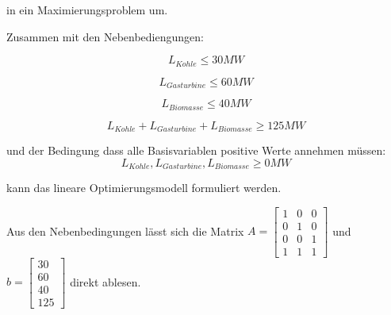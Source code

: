 \documentclass{eegreport}
\begin{document}
in ein Maximierungsproblem um.


Zusammen mit den Nebenbediengungen:

\begin{equation}
L_{Kohle} \leq 30MW
\end{equation}

\begin{equation}
L_{Gasturbine} \leq 60MW
\end{equation}

\begin{equation}
L_{Biomasse} \leq 40MW
\end{equation}

\begin{equation}
L_{Kohle} + L_{Gasturbine} + L_{Biomasse} \geq 125MW
\end{equation}

und der Bedingung dass alle Basisvariablen positive Werte annehmen müssen:
\begin{equation}
L_{Kohle},L_{Gasturbine},L_{Biomasse} \geq 0MW
\end{equation}


kann das lineare Optimierungsmodell formuliert werden.

Aus den Nebenbedingungen lässt sich die Matrix $A=\begin{bmatrix}
1 & 0 & 0 \\ 
0 & 1 & 0 \\ 
0 & 0 & 1 \\ 
1 & 1 & 1
\end{bmatrix}$ und $b=\begin{bmatrix}
30 \\ 
60 \\ 
40 \\ 
125
\end{bmatrix}$ direkt ablesen.







%

\end{document}

